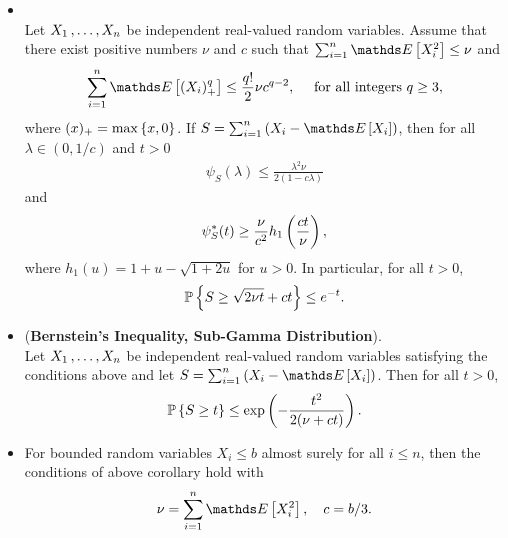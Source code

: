 \documentclass[11pt]{article}
\begin{document}
\begin{itemize}
\item \begin{proposition}  \citep{boucheron2013concentration}\\
Let $X_1 \,{,}\ldots{,}\, X_n$ be independent real-valued random variables. Assume that there exist positive numbers  $\nu$ and $c$ such that
$\sum_{i=1}^{n}\E{}{X_i^2} \le \nu$ and
\begin{align*}
\sum_{i=1}^{n}\E{}{(X_i)_{+}^q} \le \frac{q!}{2} \nu c^{q-2}, \quad \text{ for all integers }q \ge 3,
\end{align*} where $(x)_{+} = \max\left\{x, 0\right\}$. If $S = \sum_{i=1}^{n}\paren{X_i - \E{}{X_i}}$, then for all $\lambda \in (0, 1/c)$ and $t > 0$
\begin{align*}
\psi_S(\lambda) \le \frac{\lambda^2 \nu}{2(1 - c\lambda)} 
\end{align*} and
\begin{align*}
\psi_S^{*}(t) \ge \frac{\nu}{c^2}h_1\left(\frac{ct}{\nu}\right),
\end{align*} where $h_1(u) = 1+ u - \sqrt{1 + 2u}$ for $u >0$. In particular, for all $t > 0$, 
\begin{align}
{\mathbb P}\left\{S \ge \sqrt{2\nu t} + ct \right\} \le e^{-t}. \label{ineqn: bernstein_inequality_gammar_dist_0}
\end{align}
\end{proposition}

\item \begin{corollary}(\textbf{Bernstein's Inequality, Sub-Gamma Distribution}).  \citep{boucheron2013concentration}\\
Let $X_1 \,{,}\ldots{,}\, X_n$ be independent real-valued random variables satisfying the conditions above and let $S = \sum_{i=1}^{n}\paren{X_i - \E{}{X_i}}$. Then for all $t > 0$,
\begin{align}
{\mathbb P}\left\{S \ge t \right\} \le \exp\left(- \frac{t^2}{2(\nu + ct)}\right).  \label{ineqn: bernstein_inequality_gammar_dist}
\end{align}
\end{corollary}

\item \begin{remark}
For bounded random variables $X_i \le b$ almost surely for all $i \le n$, then the conditions of above corollary hold with
\begin{align*}
\nu = \sum_{i=1}^{n}\E{}{X_i^2}, \quad c = b/3.
\end{align*}
\end{remark}
\end{itemize}


\newpage


\end{document}

